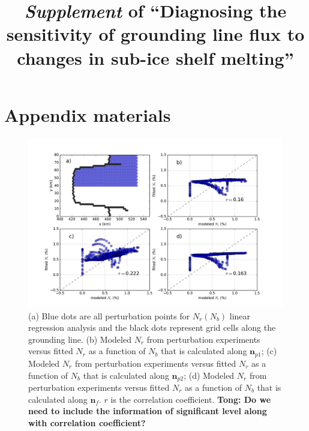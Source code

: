 \documentclass[tc, manuscript]{copernicus}
\begin{document}
\title{\textit{Supplement} of ``Diagnosing the sensitivity of grounding line flux to changes in sub-ice shelf melting''}




\received{}
\pubdiscuss{} %
\revised{}
\accepted{}
\published{}

\maketitle


\section{Appendix materials}
\renewcommand{\thefigure}{A\arabic{figure}}
\setcounter{figure}{0}

\begin{figure}
\centering
\includegraphics[width=1\linewidth]{./figs/mismip_Nb_GLF_regression_all_points.pdf}
    \caption{(a) Blue dots are all perturbation points for $N_r\left(N_b\right)$ linear regression analysis and the black dots represent grid cells along the grounding line. (b) Modeled $N_r$ from perturbation experiments versus fitted $N_r$ as a function of $N_b$ that is calculated along $\textbf{n}_{p1}$; (c) Modeled $N_r$ from perturbation experiments versus fitted $N_r$ as a function of $N_b$ that is calculated along $\textbf{n}_{p2}$; (d) Modeled $N_r$ from perturbation experiments versus fitted $N_r$ as a function of $N_b$ that is calculated along $\textbf{n}_{f}$. $r$ is the correlation coefficient. \textbf{Tong: Do we need to include the information of significant level along with correlation coefficient?}}
\label{mismip_Nb_GLF_regression_all_points}
\end{figure}
\end{document}
